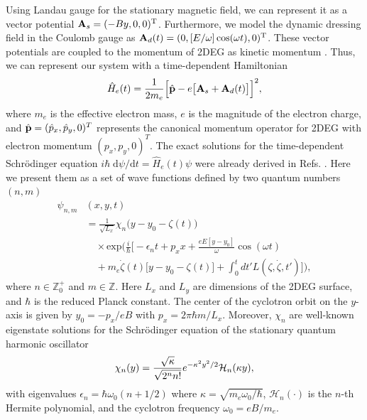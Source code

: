 Using Landau gauge for the stationary magnetic field, we can represent it as a vector potential $\vb{A}_{s} = (-By,0,0)^{\text{T}}$. Furthermore, we model the dynamic dressing field in the Coulomb gauge as $\vb{A}_{d}(t) = (0,[E/\omega ]\cos(\omega t),0)^{\text{T}}$. These vector potentials are coupled to the momentum of 2DEG as kinetic momentum \cite{mahan00,bruus04}. Thus, we can represent our system with a time-dependent Hamiltonian
\begin{equation} \label{eq_1}
  \hat{H}_e(t) = \frac{1}{2m_e}\Big[\hat{\vb{p}} - e\big[\vb{A}_{s}+\vb{A}_{d}(t)\big]\Big]^2,
\end{equation}
where $m_e$ is the effective electron mass, $e$ is the magnitude of the electron charge, and $\hat{\vb{p}} = (\hat{p}_x,\hat{p}_y,0)^{T}$ represents the canonical momentum operator for 2DEG with electron momentum $(p_{x},p_{y},0)^{T}$.
The exact solutions for the time-dependent Schrödinger equation $i\hbar\; \text{d}\psi/\text{d}t = \hat{H}_e(t) \psi$ were already derived in Refs. \cite{husimi53,ditt98,dini16}. Here we present them as a set of wave functions defined by two quantum numbers $(n,m)$
\begin{equation} \label{eq_2}
  \begin{aligned}
    \psi_{n,m}&(x,y,t)  \\
    & = \frac{1}{\sqrt{L_x}}
    \chi_n\big(y - y_0 - \zeta(t)\big)\\
    & \quad\times
    \text{exp}\bigg(
    \frac{i}{\hbar}\bigg[- \epsilon_n t
    + p_x x + \frac{eE[y - y_0]}{\omega}\cos(\omega t)\\
    & \quad+
    m_e\dot{\zeta}(t)\big[y - y_0 -\zeta(t)\big] +
    \int_0^{t}dt'L(\zeta,\dot{\zeta},t')\bigg]\bigg),
  \end{aligned}
\end{equation}
where $n \in \mathbb{Z}^{+}_0$ and $m \in \mathbb{Z}$. Here $L_{x}$ and $L_{y}$ are dimensions of the 2DEG surface, and $\hbar$ is the reduced Planck constant. The center of the cyclotron orbit on the $y$-axis is given by $y_0 = -p_x/eB$ with $p_x = 2\pi \hbar m/L_x$.
Moreover, $\chi_n$ are well-known eigenstate solutions for the Schrödinger equation of the stationary quantum harmonic oscillator
\begin{equation} \label{eq_3}
  \chi_n(y) =
   \frac{\sqrt{\kappa}}{\sqrt{2^{n}n!}}
  e^{-\kappa^2 y^2/2}
  \mathcal{H}_n \qty(\kappa y),
\end{equation}
with eigenvalues $\epsilon_n = \hbar \omega_0 (n + 1/2)$ where $\kappa = \sqrt{{m_e \omega_0}/{\hbar}}$, $\mathcal{H}_n(\cdot)$ is the $n$-th Hermite polynomial, and the cyclotron frequency $\omega_0 = eB/m_e$.
